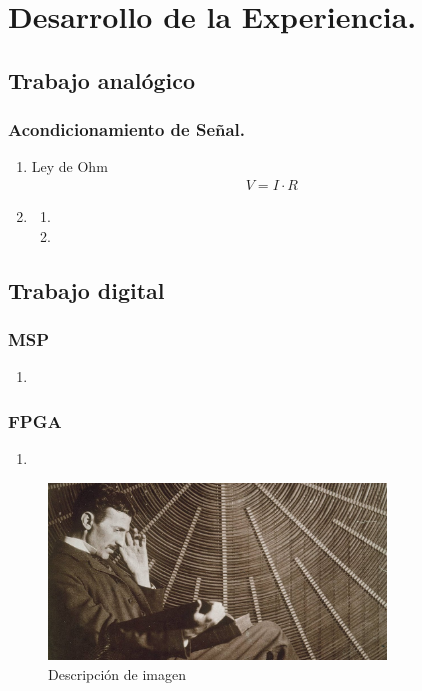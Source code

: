 \section{Desarrollo de la Experiencia.}
\subsection{Trabajo analógico}
\subsubsection{Acondicionamiento de Señal.}
\begin{enumerate}
    \item Ley de Ohm
    \begin{gather}
        V=I\cdot R
    \end{gather}
    \item
        \begin{enumerate}
            \item 
            \item
        \end{enumerate}
        
\end{enumerate}

\subsection{Trabajo digital}
\subsubsection{MSP}
\begin{enumerate}
    \item 
\end{enumerate}

\subsubsection{FPGA}
\begin{enumerate}
    \item 
\end{enumerate}

\begin{figure}[H]
        \centering
        \includegraphics[width=0.8\textwidth]{IMG/Nikola.jpg}
        \caption{Descripción de imagen}
        \label{fig:Imagen1}
 \end{figure}


